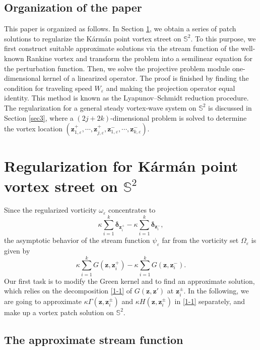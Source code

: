 \documentclass[12pt,reqno]{amsart}
\numberwithin{equation}{section}
\theoremstyle{definition}
\theoremstyle{remark}
\begin{document}
    \subsection{Organization of the paper}
    
    This paper is organized as follows. In Section \ref{sec2}, we obtain a series of patch solutions to regularize the K\'arm\'an point vortex street on $\mathbb S^2$. 
    To this purpose, we first construct suitable approximate solutions via the stream function of the well-known Rankine vortex and transform the problem into 
    a semilinear equation for the perturbation function. Then, we solve the projective problem module one-dimensional kernel of a linearized operator. 
    The proof is finished by finding the condition for traveling speed $W_\varepsilon$ and making the projection operator equal identity.
    This method is known as the Lyapunov--Schmidt reduction procedure. The regularization for a general steady vortex-wave system on $\mathbb S^2$ is 
    discussed in Section \ref{sec3}, where a $(2j+2k)$-dimensional problem is solved to determine the vortex location 
    $(\boldsymbol z_{1,\varepsilon}^+,\cdots,\boldsymbol z_{j,\varepsilon}^+, \boldsymbol z_{1,\varepsilon}^-,\cdots, \boldsymbol z_{k,\varepsilon}^-)$.
    
	\section{Regularization for K\'arm\'an point vortex street on $\mathbb S^2$}\label{sec2}	
	Since the regularized vorticity $\omega_\varepsilon$ concentrates to 
	$$\kappa\sum\limits_{i=1}^{k}\boldsymbol \delta_{\boldsymbol z_i^+}-\kappa\sum\limits_{i=1}^{k}\boldsymbol \delta_{\boldsymbol z_i^-},$$
	the asymptotic behavior of the stream function $\psi_\varepsilon$ far from the vorticity set $\Omega_\varepsilon$ is given by 
	$$\kappa\sum\limits_{i=1}^{k}G(\boldsymbol z,\boldsymbol z_i^+)-\kappa\sum\limits_{i=1}^{k}G(\boldsymbol z,\boldsymbol z_i^-).$$ 
	Our first task is to modify the Green kernel and to find an approximate solution, which relies on the decomposition \eqref{1-1} of $G(\boldsymbol z,\boldsymbol z')$ 
	at $\boldsymbol z_i^\pm$.  In the following, we are going to approximate
	 $\kappa\Gamma(\boldsymbol z, \boldsymbol z_i^\pm)$ and $\kappa H(\boldsymbol z, \boldsymbol z_i^\pm)$ in \eqref{1-1} separately, 
	 and make up a vortex patch solution on $\mathbb S^2$.
	
	\subsection{The approximate stream function}
	
\end{document}
